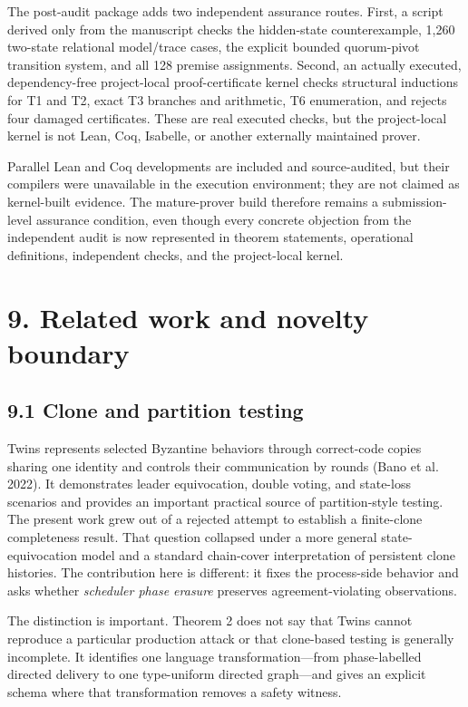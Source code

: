 \documentclass[10pt,a4paper]{article}
\begin{document}
The post-audit package adds two independent assurance routes. First, a
script derived only from the manuscript checks the hidden-state
counterexample, 1,260 two-state relational model/trace cases, the
explicit bounded quorum-pivot transition system, and all 128 premise
assignments. Second, an actually executed, dependency-free project-local
proof-certificate kernel checks structural inductions for T1 and T2,
exact T3 branches and arithmetic, T6 enumeration, and rejects four
damaged certificates. These are real executed checks, but the
project-local kernel is not Lean, Coq, Isabelle, or another externally
maintained prover.

Parallel Lean and Coq developments are included and source-audited, but
their compilers were unavailable in the execution environment; they are
not claimed as kernel-built evidence. The mature-prover build therefore
remains a submission-level assurance condition, even though every
concrete objection from the independent audit is now represented in
theorem statements, operational definitions, independent checks, and the
project-local kernel.

\section{9. Related work and novelty
boundary}\label{related-work-and-novelty-boundary}

\subsection{9.1 Clone and partition
testing}\label{clone-and-partition-testing}

Twins represents selected Byzantine behaviors through correct-code
copies sharing one identity and controls their communication by rounds
(Bano et al. 2022). It demonstrates leader equivocation, double voting,
and state-loss scenarios and provides an important practical source of
partition-style testing. The present work grew out of a rejected attempt
to establish a finite-clone completeness result. That question collapsed
under a more general state-equivocation model and a standard chain-cover
interpretation of persistent clone histories. The contribution here is
different: it fixes the process-side behavior and asks whether
\emph{scheduler phase erasure} preserves agreement-violating
observations.

The distinction is important. Theorem 2 does not say that Twins cannot
reproduce a particular production attack or that clone-based testing is
generally incomplete. It identifies one language transformation---from
phase-labelled directed delivery to one type-uniform directed
graph---and gives an explicit schema where that transformation removes a
safety witness.
\end{document}
